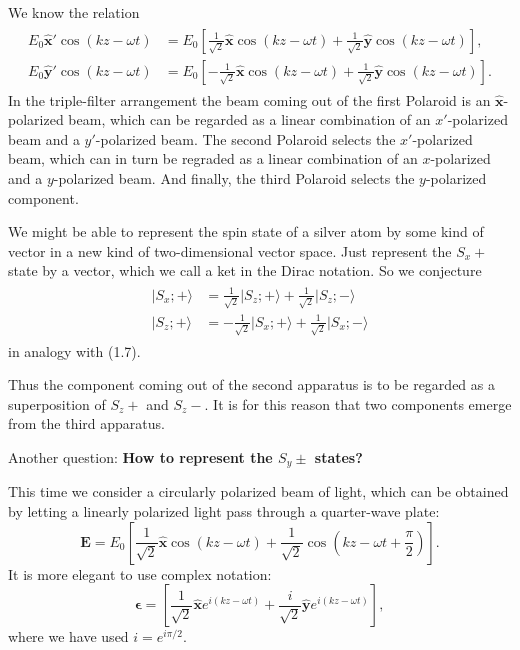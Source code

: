 \documentclass[11pt]{elegantbook}
\begin{document}
We know the relation 
\begin{align}
  \begin{split}
    E_0\bm{\hat{x}'}\cos(kz-\omega t)&=E_0[\frac{1}{\sqrt{2}}\bm{\hat{x}}\cos(kz-\omega t)+\frac{1}{\sqrt{2}}\bm{\hat{y}}\cos(kz-\omega t)],\\
    E_0\bm{\hat{y}'}\cos(kz-\omega t)&=E_0[-\frac{1}{\sqrt{2}}\bm{\hat{x}}\cos(kz-\omega t)+\frac{1}{\sqrt{2}}\bm{\hat{y}}\cos(kz-\omega t)].
  \end{split}
\end{align}
In the triple-filter arrangement the beam coming out of the first Polaroid is an $\bm{\hat{x}}$-polarized 
beam, which can be regarded as a linear combination of an $x'$-polarized beam and a 
$y'$-polarized beam. The second Polaroid selects the $x'$-polarized beam, which can in 
turn be regraded as a linear combination of an $x$-polarized and a $y$-polarized beam. 
And finally, the third Polaroid selects the $y$-polarized component.

We might be able to represent the spin state of a silver atom by some kind of vector in 
a new kind of two-dimensional vector space. Just represent the $S_x+$ state by a vector, 
which we call a ket in the Dirac notation. So we conjecture 
\begin{align}
  \begin{split}
    \vert S_x;+\rangle&=\frac{1}{\sqrt{2}}\vert S_z;+\rangle+\frac{1}{\sqrt{2}}\vert S_z;-\rangle\\
    \vert S_z;+\rangle&=-\frac{1}{\sqrt{2}}\vert S_x;+\rangle+\frac{1}{\sqrt{2}}\vert S_x;-\rangle 
  \end{split}
\end{align}
in analogy with (1.7).

Thus the component coming out of the second apparatus is to be regarded as a superposition 
of $S_z+$ and $S_z-$. It is for this reason that two components emerge from the third apparatus.

Another question: \textbf{How to represent the $S_y\pm$ states?}

This time we consider a circularly polarized beam of light, which can be obtained by letting 
a linearly polarized light pass through a quarter-wave plate: 
\begin{equation}
  \bm{E}=E_0[\frac{1}{\sqrt{2}}\bm{\hat{x}}\cos(kz-\omega t)+\frac{1}{\sqrt{2}}\cos(kz-\omega t+\frac{\pi}{2})].
\end{equation}
It is more elegant to use complex notation:
\begin{equation}
  \bm{\epsilon}=[\frac{1}{\sqrt{2}}\bm{\hat{x}}e^{i(kz-\omega t)}+\frac{i}{\sqrt{2}}\bm{\hat{y}}e^{i(kz-\omega t)}],
\end{equation}
where we have used $i=e^{i\pi/2}$.
\end{document}

